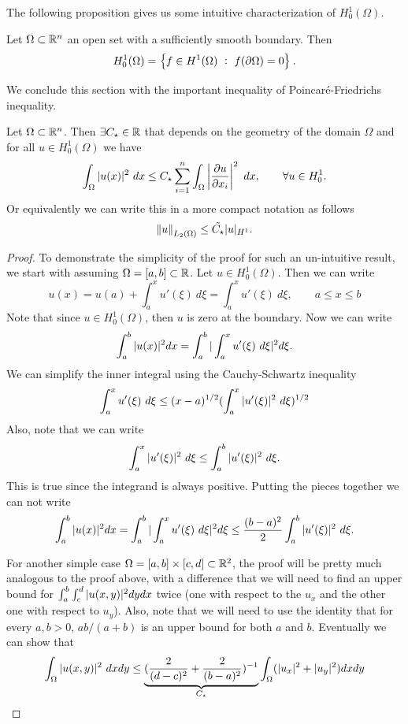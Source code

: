 The following proposition gives us some intuitive characterization of $ H^1_0(\Omega) $.

\begin{proposition}
	Let $ \Omega \subset\mathbb{R}^n $ an open set with a sufficiently smooth boundary. Then 
	\[ H_0^1(\Omega) = \Set{f \in H^1(\Omega)\ :\ f(\partial \Omega) = 0}.   \]
\end{proposition}

We conclude this section with the important inequality of Poincar\'{e}-Friedrichs inequality.

\begin{theorem}
	\label{thm:PoincareInequality}
	Let $ \Omega \subset \mathbb{R}^n $. Then $ \exists C_{\star} \in \mathbb{R} $ that depends on the geometry of the domain $ \Omega $ and for all $ u \in H_0^1(\Omega) $ we have
	\[ \int_\Omega |u(x)|^2\ dx \leq  C_{\star} \sum_{i=1}^{n} \int_\Omega \left| \frac{\partial u}{\partial x_i} \right|^2\ dx, \qquad \forall u \in H_0^1. \]
	Or equivalently we can write this in a more compact notation as follows
	\[ \norm{u}_{L_2(\Omega)} \leq \tilde{C_{\star}} |u|_{H^1}. \]
\end{theorem}
\begin{proof}
	To demonstrate the simplicity of the proof for such an un-intuitive result, we start with assuming $ \Omega = [a,b] \subset \mathbb{R} $. Let $ u \in H^1_0(\Omega) $. Then we can write
	\[ u(x) = u(a) + \int_{a}^{x}u'(\xi)\ d\xi = \int_{a}^{x}u'(\xi)\ d\xi, \qquad a\leq x\leq b \]
	Note that since $ u \in H_0^1(\Omega) $, then $ u $ is zero at the boundary. Now we can write
	\[ \int_{a}^{b} |u(x)|^2 dx = \int_{a}^{b}|\int_{a}^{x}u'(\xi)\ d\xi|^2 d\xi. \]
	We can simplify the inner integral using the Cauchy-Schwartz inequality
	\[ \int_{a}^{x} u'(\xi)\ d\xi \leq (x-a)^{1/2}(\int_{a}^{x}|u'(\xi)|^2\ d\xi)^{1/2} \]
	Also, note that we can write
	\[ \int_{a}^{x} |u'(\xi)|^2\ d\xi \leq \int_{a}^{b}|u'(\xi)|^2\ d\xi.  \]
	This is true since the integrand is always positive. Putting the pieces together we can not write
	\[ \int_{a}^{b} |u(x)|^2 dx = \int_{a}^{b}|\int_{a}^{x}u'(\xi)\ d\xi|^2 d\xi \leq \frac{(b-a)^2}{2} \int_{a}^{b}|u'(\xi)|^2\ d\xi. \]
	
	For another simple case $ \Omega = [a,b]\times [c,d] \subset \mathbb{R}^2 $, the proof will be pretty much analogous to the proof above, with a difference that we will need to find an upper bound for $\int_{a}^{b}\int_{c}^{d}|u(x,y)|^2dydx$ twice (one with respect to the $ u_x $ and the other one with respect to $ u_y $). Also, note that we will need to use the identity that for every $ a,b >0 $, $ ab/(a+b) $ is an upper bound for both $ a $ and $ b $. Eventually we can show that 
	\[ \int_{\Omega} |u(x,y)|^2\ dxdy \leq \underbrace{(\frac{2}{(d-c)^2} + \frac{2}{(b-a)^2})^{-1}}_{C_\star}\int_\Omega (|u_x|^2 + |u_y|^2) dxdy \]
\end{proof}

